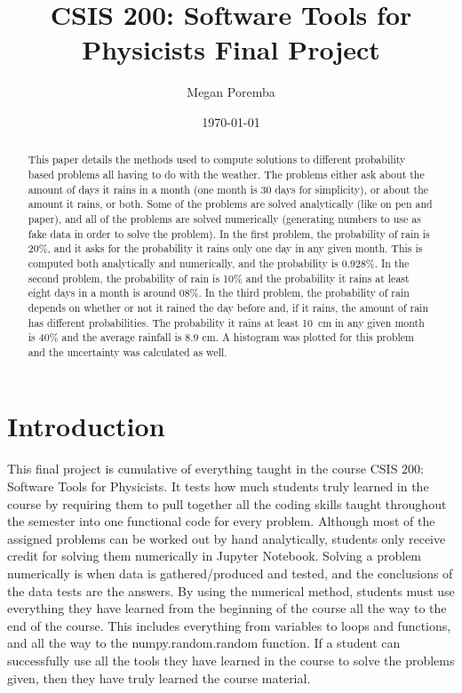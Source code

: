 \documentclass[twocolumn]{revtex4}
\title{CSIS 200: Software Tools for Physicists Final Project}
\begin{document}
\author{Megan Poremba}
\date{\today}




\begin{abstract}

	This paper details the methods used to compute solutions to different probability
	based problems all having to do with the weather. The problems either ask about the 
	amount of days it rains in a month (one month is 30 days for simplicity), or about the 
	amount it rains, 
	or both. Some of the problems are solved analytically (like on pen and paper), and all of 
	the problems are solved numerically (generating numbers to use as fake data in order 
	to solve the problem). In the first problem, the probability of rain is 20\%, and it asks for 
	the probability it rains only one day in any given month. This is computed both 
	analytically and numerically, and the probability is 0.928\%. In the second problem, the 
	probability of rain is 10\% and the probability it rains at least eight days in a month is 
	around 08\%. In the third problem, the probability of rain depends on whether or not
	it rained the day before and, if it rains, the amount of rain has different probabilities. 
	The probability it rains at least 10~cm in any given month is 40\% and the average
	rainfall is 8.9 cm. A histogram was plotted for this problem and the uncertainty was
	calculated as well.

\end{abstract}
\section{Introduction}

	This final project is cumulative of everything taught in the course CSIS 200: 
	Software Tools for Physicists. It tests how much students truly learned in the
	course by requiring them to pull together all the coding skills taught throughout the 
	semester into one functional code for every problem. Although most of the 
	assigned problems can be worked out by hand analytically, students only receive 
	credit for solving them numerically in Jupyter Notebook. Solving a problem numerically
	is when data is gathered/produced and tested, and the conclusions of the data tests
	are the answers. By using the numerical method, students must use everything they 
	have learned from the beginning of the course all the way to the end of the course. This 
	includes everything from variables to loops and functions, and all the way to the 
	numpy.random.random function. If a student can successfully use all the tools they 
	have learned in the course to solve the problems given, then they have truly learned the 
	course material.
\end{document}
